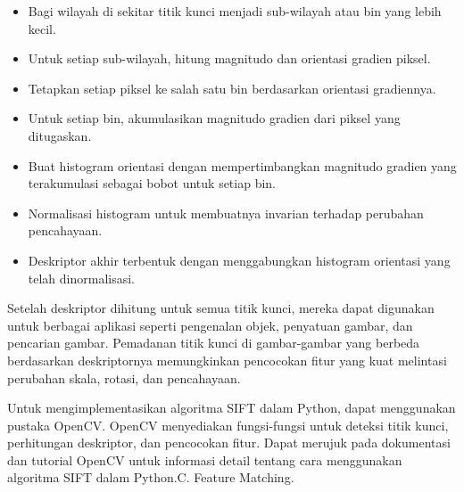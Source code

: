 \documentclass[
  letterpaper,
  DIV=11,
  numbers=noendperiod]{scrreprt}
\providecommand{\tightlist}{%
  \setlength{\itemsep}{0pt}\setlength{\parskip}{0pt}}\usepackage{longtable,booktabs,array}
\begin{document}
\begin{itemize}
\tightlist
\item
  Bagi wilayah di sekitar titik kunci menjadi sub-wilayah atau bin yang
  lebih kecil.
\item
  Untuk setiap sub-wilayah, hitung magnitudo dan orientasi gradien
  piksel.
\item
  Tetapkan setiap piksel ke salah satu bin berdasarkan orientasi
  gradiennya.
\item
  Untuk setiap bin, akumulasikan magnitudo gradien dari piksel yang
  ditugaskan.
\item
  Buat histogram orientasi dengan mempertimbangkan magnitudo gradien
  yang terakumulasi sebagai bobot untuk setiap bin.
\item
  Normalisasi histogram untuk membuatnya invarian terhadap perubahan
  pencahayaan.
\item
  Deskriptor akhir terbentuk dengan menggabungkan histogram orientasi
  yang telah dinormalisasi.
\end{itemize}

Setelah deskriptor dihitung untuk semua titik kunci, mereka dapat
digunakan untuk berbagai aplikasi seperti pengenalan objek, penyatuan
gambar, dan pencarian gambar. Pemadanan titik kunci di gambar-gambar
yang berbeda berdasarkan deskriptornya memungkinkan pencocokan fitur
yang kuat melintasi perubahan skala, rotasi, dan pencahayaan.

Untuk mengimplementasikan algoritma SIFT dalam Python, dapat menggunakan
pustaka OpenCV. OpenCV menyediakan fungsi-fungsi untuk deteksi titik
kunci, perhitungan deskriptor, dan pencocokan fitur. Dapat merujuk pada
dokumentasi dan tutorial OpenCV untuk informasi detail tentang cara
menggunakan algoritma SIFT dalam Python.C. Feature Matching.\\
\end{document}
